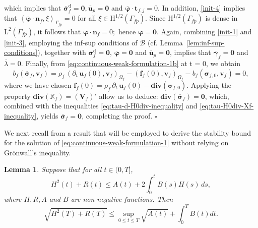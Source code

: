 \documentclass[11pt]{article}
\numberwithin{equation}{section}
\newcommand{\bgamma}{{\boldsymbol\gamma}}
\newcommand{\bsi}{{\boldsymbol\sigma}}
\newcommand{\bvarphi}{{\boldsymbol\varphi}}
\newcommand{\bv}{{\mathbf{v}}}
\newcommand{\f}{\mathbf{f}}
\newcommand{\bu}{\mathbf{u}}
\newcommand{\bt}{{\mathbf{t}}}
\newcommand{\bn}{{\mathbf{n}}}
\newcommand{\0}{{\mathbf{0}}}
\def\bV{\mathbf{V}}
\newcommand\bbX{\mathbb{X}}
\newcommand{\cB}{\mathcal{B}}
\def\H{\mathrm{H}}
\def\L{\mathrm{L}}
\def\rd{\mathrm{d}}
\def\bdiv{\mathbf{div}}
\def\pil{\left<}
\def\pir{\right>}
\newtheorem{lem}[thm]{Lemma}
\newenvironment{proof}{\noindent{\it Proof.}}{\hfill$\square$}
\numberwithin{equation}{section}
\begin{document}
\begin{proof}
\begin{equation*}
\end{equation*}
which implies that $\overline{\bsi}^\rd_f = \0, \overline{\bu}_p=\0$ and $\overline{\bvarphi}\cdot \bt_{f,j} = 0.$ In addition, \eqref{init-4} implies that $\pil\overline{\bvarphi}\cdot\bn_f,\xi\pir_{\Gamma_{fp}} = 0$ for all $\xi \in \H^{1/2}(\Gamma_{fp}).$  Since $\H^{1/2}(\Gamma_{fp})$ 
is dense in $\L^2(\Gamma_{fp})$, it follows that $\overline{\bvarphi}\cdot\bn_f= 0;$ hence $\overline{\bvarphi}=\0$. Again, combining \eqref{init-1} and \eqref{init-3}, employing the inf-sup conditions of $\cB$ (cf. Lemma~\ref{lem:inf-sup-conditions}), together with  $\overline{\bsi}^\rd_f = \0$, $\overline{\bvarphi} = \0$ and $\overline{\bu}_p=\0$, implies that $\overline{\bgamma}_f = \0$ and $\overline{\lambda} =0$. Finally, from \eqref{eq:continuous-weak-formulation-1b} at t = 0, we obtain
\begin{equation}\label{div-sigf-init}
  b_f(\overline\bsi_{f},\bv_f) =  \rho_f\, (\partial_t\,\bu_f(0),\bv_f)_{\Omega_f} - (\f_f(0),\bv_f)_{\Omega_f} - b_f(\bsi_{f,0},\bv_f) = 0,
\end{equation}
where we have chosen $\f_f(0)= \rho_f\,\partial_t\,\bu_f(0) - \bdiv(\bsi_{f,0})$. Applying the property $\bdiv(\bbX_f) = (\bV_f)'$ allow us to deduce: $\bdiv(\overline{\bsi}_f) = \0$, which, combined with the inequalities \eqref{eq:tau-d-H0div-inequality} and \eqref{eq:tau-H0div-Xf-inequality}, yields $\overline{\bsi}_f = \0$, completing the proof.
\end{proof}

We next recall from \cite[Lemma 3.3]{cwy2025} a result that will be employed to derive the stability bound for the solution of \eqref{eq:continuous-weak-formulation-1} without relying on Gr\"onwall's inequality.
%
\begin{lem}\label{xing-lemma}
Suppose that for all $t \in (0,T]$,
\begin{equation*}%
H^2(t) + R(t) \leq A(t) + 2 \int_0^t B(s) H(s) \, ds,
\end{equation*}
where $H, R, A$ and $B$ are non-negative functions. Then
\begin{equation*}%
\sqrt{H^2(T) + R(T)} \leq \sup_{0\leq t\leq T} \sqrt{A(t)} + \int_0^T B(t) dt.
\end{equation*}
\end{lem}
%
%
\end{document}
